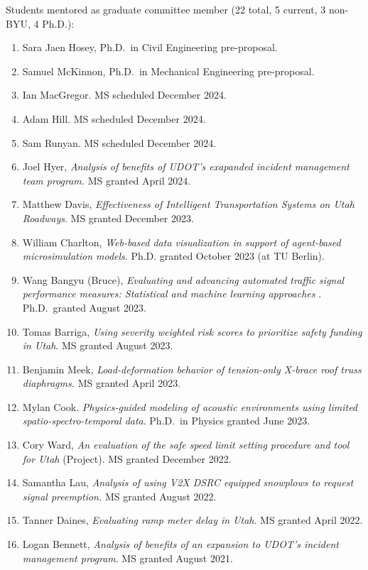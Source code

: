 \documentclass[margin,line]{res}
\newif\ifdetail
\newcounter{enuminitialize}
\newenvironment{myenum}[1][]
{%
 \setcounter{enuminitialize}{#1}
 \addtocounter{enuminitialize}{2}
 \begin{enumerate}[left= 4pt, itemsep=8pt, start=\value{enuminitialize}, label=\arabic*\addtocounter{enumi}{-2}]
}
{%
 \end{enumerate}
}
\begin{document}
\begin{resume}
Students mentored as graduate committee member (22 total, 5 current, 3 non-BYU, 4 Ph.D.):
\vspace{0.3cm}
\begin{myenum}[22]
  \ifdetail {\color{NavyBlue} \fi
  \item Sara Jaen Hosey, Ph.D.\ in Civil Engineering pre-proposal.
  \item Samuel McKinnon, Ph.D.\ in Mechanical Engineering pre-proposal.
  \item Ian MacGregor. MS scheduled December 2024.
  \item Adam Hill. MS scheduled December 2024.
  \item Sam Runyan. MS scheduled December 2024.
  \item Joel Hyer, \textit{Analysis of benefits of UDOT's exapanded incident management team program.} MS granted April 2024.
  \item Matthew Davis, \textit{Effectiveness of Intelligent Transportation Systems on Utah Roadways}. MS granted December 2023.
  \item William Charlton, \textit{Web-based data visualization in support of agent-based microsimulation models}. Ph.D. granted October 2023 (at TU Berlin).
  \item Wang Bangyu (Bruce), \textit{Evaluating and advancing automated traffic signal performance measures: Statistical and machine learning approaches }. Ph.D.\ granted August 2023.
  \item Tomas Barriga, \textit{Using severity weighted risk scores to prioritize safety funding in Utah}. MS granted August 2023.
  \item Benjamin Meek, \textit{Load-deformation behavior of tension-only X-brace roof truss diaphragms.} MS granted April 2023.
  \item Mylan Cook. \textit{Physics-guided modeling of acoustic environments using limited spatio-spectro-temporal data}. Ph.D.\ in Physics granted June 2023.
  \item Cory Ward, \textit{An evaluation of the safe speed limit setting procedure and tool for Utah} (Project). MS granted December 2022.
  \item Samantha Lau, \textit{Analysis of using V2X DSRC equipped snowplows to request signal preemption.} MS granted August 2022.
  \item Tanner Daines, \textit{Evaluating ramp meter delay in Utah}. MS granted April 2022.
  \ifdetail } \fi
  \item Logan Bennett, \textit{Analysis of benefits of an expansion to UDOT’s incident management program}. MS granted August 2021.

\end{myenum}
\end{resume}
\end{document}
